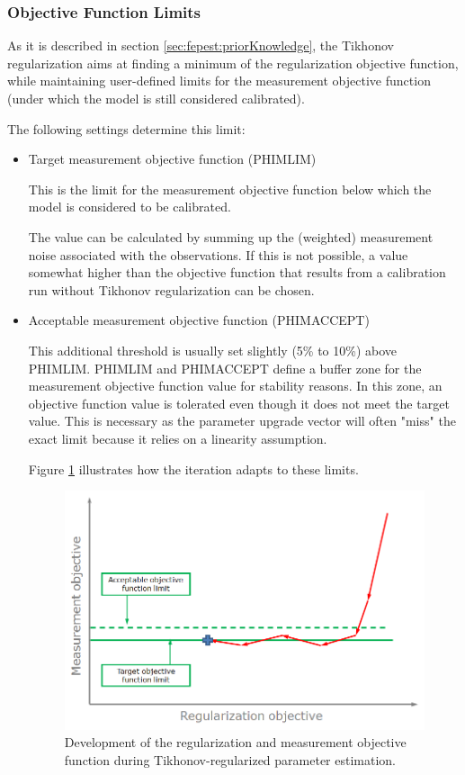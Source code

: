 \subsubsection{Objective Function Limits}

As it is described in section \ref{sec:fepest:priorKnowledge}, the Tikhonov regularization aims at finding a minimum of the regularization objective function, while maintaining user-defined limits for the measurement objective function (under which the model is still considered calibrated).

The following settings determine this limit:

\begin{itemize}

\item Target measurement objective function (PHIMLIM)

This is the limit for the measurement objective function below which the model is considered to be calibrated.

The value can be calculated by summing up the (weighted) measurement noise associated with the observations. If this is not possible, a value somewhat higher than the objective function that results from a calibration run without Tikhonov regularization can be chosen.

\item Acceptable measurement objective function (PHIMACCEPT)

This additional threshold is usually set slightly (5\% to 10\%) above PHIMLIM. PHIMLIM and PHIMACCEPT define a buffer zone for the measurement objective function value for stability reasons. In this zone, an objective function value is tolerated even though it does not meet the target value. This is necessary as the parameter upgrade vector will often "miss" the exact limit because it relies on a linearity assumption.

Figure \ref{fig:fepest:objectiveFunctionLimits} illustrates how the iteration adapts to these limits.

\begin{figure}
	\center
	\includegraphics[width=\columnwidth]{figureFundamentalSetup/objectiveFunctionLimits.png}
\caption{Development of the regularization and measurement objective function during Tikhonov-regularized parameter estimation.}
\label{fig:fepest:objectiveFunctionLimits}
\end{figure}


\end{itemize}
